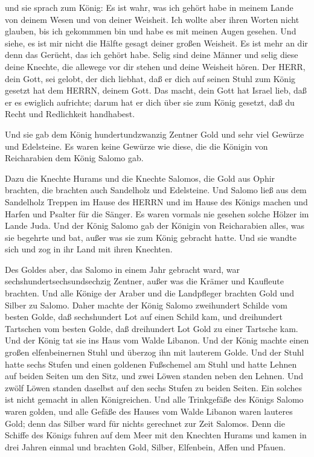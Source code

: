  und sie sprach zum König: Es ist wahr, was ich gehört habe
in meinem Lande von deinem Wesen und von deiner Weisheit. 
Ich wollte aber ihren Worten nicht glauben, bis ich gekommmen bin und
habe es mit meinen Augen gesehen. Und siehe, es ist mir nicht die Hälfte
gesagt deiner großen Weisheit. Es ist mehr an dir denn das Gerücht, das
ich gehört habe.  Selig sind deine Männer und selig diese
deine Knechte, die allewege vor dir stehen und deine Weisheit hören.
 Der HERR, dein Gott, sei gelobt, der dich liebhat, daß er
dich auf seinen Stuhl zum König gesetzt hat dem HERRN, deinem Gott. Das
macht, dein Gott hat Israel lieb, daß er es ewiglich aufrichte; darum
hat er dich über sie zum König gesetzt, daß du Recht und Redlichkeit
handhabest.

 Und sie gab dem König hundertundzwanzig Zentner Gold und
sehr viel Gewürze und Edelsteine. Es waren keine Gewürze wie diese, die
die Königin von Reicharabien dem König Salomo gab.

 Dazu die Knechte Hurams und die Knechte Salomos, die Gold
aus Ophir brachten, die brachten auch Sandelholz und Edelsteine.
 Und Salomo ließ aus dem Sandelholz Treppen im Hause des
HERRN und im Hause des Königs machen und Harfen und Psalter für die
Sänger. Es waren vormals nie gesehen solche Hölzer im Lande Juda.
 Und der König Salomo gab der Königin von Reicharabien
alles, was sie begehrte und bat, außer was sie zum König gebracht hatte.
Und sie wandte sich und zog in ihr Land mit ihren Knechten.

 Des Goldes aber, das Salomo in einem Jahr gebracht ward,
war sechshundertsechsundsechzig Zentner,  außer was die
Krämer und Kaufleute brachten. Und alle Könige der Araber und die
Landpfleger brachten Gold und Silber zu Salomo.  Daher
machte der König Salomo zweihundert Schilde vom besten Golde, daß
sechshundert Lot auf einen Schild kam,  und dreihundert
Tartschen vom besten Golde, daß dreihundert Lot Gold zu einer Tartsche
kam.  Und der König tat sie ins Haus vom Walde Libanon. Und
der König machte einen großen elfenbeinernen Stuhl und überzog ihn mit
lauterem Golde.  Und der Stuhl hatte sechs Stufen und einen
goldenen Fußschemel am Stuhl und hatte Lehnen auf beiden Seiten um den
Sitz, und zwei Löwen standen neben den Lehnen.  Und zwölf
Löwen standen daselbst auf den sechs Stufen zu beiden Seiten. Ein
solches ist nicht gemacht in allen Königreichen.  Und alle
Trinkgefäße des Königs Salomo waren golden, und alle Gefäße des Hauses
vom Walde Libanon waren lauteres Gold; denn das Silber ward für nichts
gerechnet zur Zeit Salomos.  Denn die Schiffe des Königs
fuhren auf dem Meer mit den Knechten Hurams und kamen in drei Jahren
einmal und brachten Gold, Silber, Elfenbein, Affen und Pfauen.

